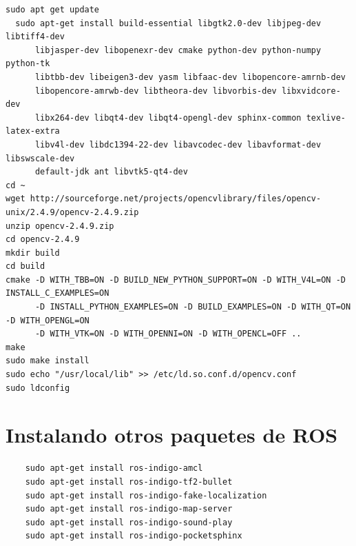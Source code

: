 \documentclass[user_manual.tex]{subfiles}
\begin{document}
\begin{Verbatim}[fontsize=\footnotesize]
  sudo apt get update
  sudo apt-get install build-essential libgtk2.0-dev libjpeg-dev libtiff4-dev
      libjasper-dev libopenexr-dev cmake python-dev python-numpy python-tk
      libtbb-dev libeigen3-dev yasm libfaac-dev libopencore-amrnb-dev
      libopencore-amrwb-dev libtheora-dev libvorbis-dev libxvidcore-dev
      libx264-dev libqt4-dev libqt4-opengl-dev sphinx-common texlive-latex-extra
      libv4l-dev libdc1394-22-dev libavcodec-dev libavformat-dev libswscale-dev
      default-jdk ant libvtk5-qt4-dev
cd ~
wget http://sourceforge.net/projects/opencvlibrary/files/opencv-unix/2.4.9/opencv-2.4.9.zip
unzip opencv-2.4.9.zip
cd opencv-2.4.9
mkdir build
cd build
cmake -D WITH_TBB=ON -D BUILD_NEW_PYTHON_SUPPORT=ON -D WITH_V4L=ON -D INSTALL_C_EXAMPLES=ON
      -D INSTALL_PYTHON_EXAMPLES=ON -D BUILD_EXAMPLES=ON -D WITH_QT=ON -D WITH_OPENGL=ON
      -D WITH_VTK=ON -D WITH_OPENNI=ON -D WITH_OPENCL=OFF ..
make
sudo make install
sudo echo "/usr/local/lib" >> /etc/ld.so.conf.d/opencv.conf
sudo ldconfig
\end{Verbatim}

\section{Instalando otros paquetes de ROS}
\begin{verbatim}
    sudo apt-get install ros-indigo-amcl
    sudo apt-get install ros-indigo-tf2-bullet
    sudo apt-get install ros-indigo-fake-localization
    sudo apt-get install ros-indigo-map-server
    sudo apt-get install ros-indigo-sound-play
    sudo apt-get install ros-indigo-pocketsphinx
\end{verbatim}
\end{document}
